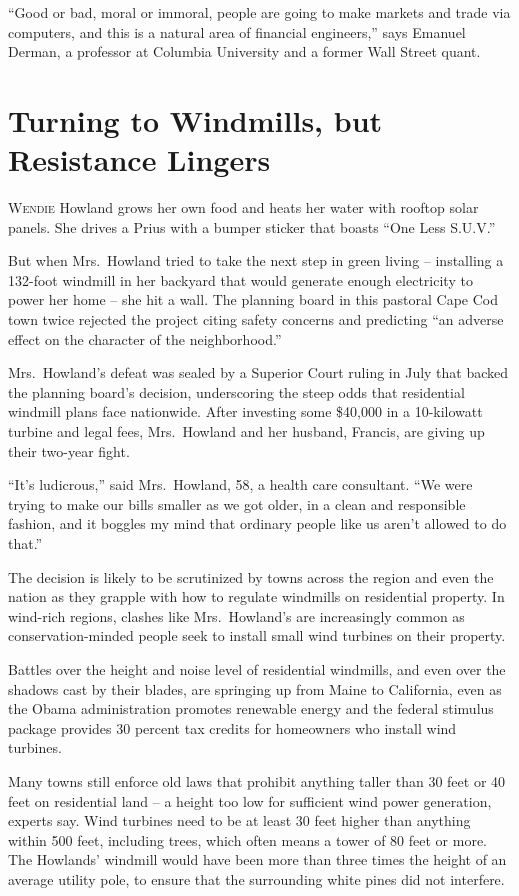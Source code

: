﻿\documentclass[12pt]{article}
\begin{document}
``Good or bad, moral or immoral, people are going to make markets and trade via computers, and this
is a natural area of financial engineers,'' says Emanuel Derman, a professor at Columbia University
and a former Wall Street quant.

\section{Turning to Windmills, but Resistance Lingers}

\lettrine{W}{endie} Howland grows her own food and heats her water with rooftop solar panels. She
drives a Prius with a bumper sticker that boasts ``One Less S.U.V.''

But when Mrs.~Howland tried to take the next step in green living -- installing a 132-foot windmill
in her backyard that would generate enough electricity to power her home -- she hit a wall. The
planning board in this pastoral Cape Cod town twice rejected the project citing safety concerns and
predicting ``an adverse effect on the character of the neighborhood.''

Mrs.~Howland's defeat was sealed by a Superior Court ruling in July that backed the planning board's
decision, underscoring the steep odds that residential windmill plans face nationwide. After
investing some \$40,000 in a 10-kilowatt turbine and legal fees, Mrs.~Howland and her husband,
Francis, are giving up their two-year fight.

``It's ludicrous,'' said Mrs.~Howland, 58, a health care consultant. ``We were trying to make our
bills smaller as we got older, in a clean and responsible fashion, and it boggles my mind that
ordinary people like us aren't allowed to do that.''

The decision is likely to be scrutinized by towns across the region and even the nation as they
grapple with how to regulate windmills on residential property. In wind-rich regions, clashes like
Mrs.~Howland's are increasingly common as conservation-minded people seek to install small wind
turbines on their property.

Battles over the height and noise level of residential windmills, and even over the shadows cast by
their blades, are springing up from Maine to California, even as the Obama administration promotes
renewable energy and the federal stimulus package provides 30 percent tax credits for homeowners who
install wind turbines.

Many towns still enforce old laws that prohibit anything taller than 30 feet or 40 feet on
residential land -- a height too low for sufficient wind power generation, experts say. Wind
turbines need to be at least 30 feet higher than anything within 500 feet, including trees, which
often means a tower of 80 feet or more. The Howlands' windmill would have been more than three times
the height of an average utility pole, to ensure that the surrounding white pines did not interfere.
\end{document}
